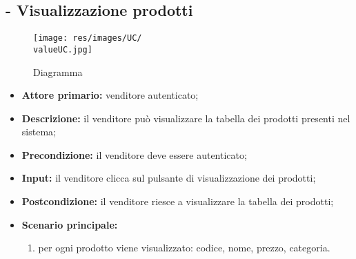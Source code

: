 \stepUserCase
\subsection{- Visualizzazione prodotti}
\begin{figure}[H]
    \centering
    \texttt{[image: res/images/UC/\\valueUC.jpg]}
    \caption{Diagramma }
\end{figure}
\begin{itemize}
    \item \textbf{Attore primario:} venditore autenticato;
    \item \textbf{Descrizione:} il venditore può visualizzare la tabella dei prodotti presenti nel sistema;
    \item \textbf{Precondizione:} il venditore deve essere autenticato;
    \item \textbf{Input:} il venditore clicca sul pulsante di visualizzazione dei prodotti;
    \item \textbf{Postcondizione:} il venditore riesce a visualizzare la tabella dei prodotti;
    \item \textbf{Scenario principale:}
        \begin{enumerate}
            \item per ogni prodotto viene visualizzato: codice, nome, prezzo, categoria.
        \end{enumerate}
\end{itemize}

\stepUserCase
